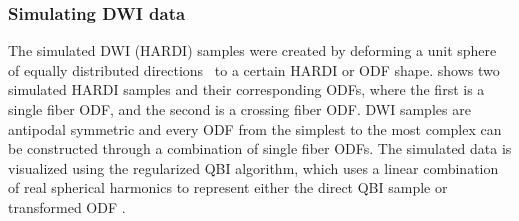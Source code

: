 \documentclass[twocolumn]{svjour3}
\begin{document}
\subsubsection{Simulating DWI data}
The simulated DWI (HARDI) samples were created by deforming a unit sphere of equally
distributed directions~\cite{semechko2012suite} to a certain HARDI or ODF
shape.  shows two simulated HARDI samples and their corresponding
ODFs, where the first is a single fiber ODF, and the second is a crossing fiber ODF. DWI
samples are antipodal symmetric and every ODF from the simplest to the most complex can be
constructed through a combination of single fiber ODFs. The simulated data is visualized
using the regularized QBI algorithm, which uses a linear combination of real spherical
harmonics to represent either the direct QBI sample or transformed ODF
\cite{descoteaux2007regularized}.
\end{document}
